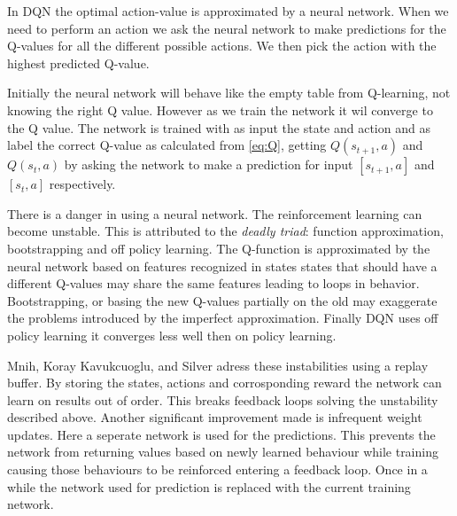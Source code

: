 In DQN the optimal action-value is approximated by a neural network. When we need to perform an action we ask the neural network to make predictions for the Q-values for all the different possible actions. We then pick the action with the highest predicted Q-value. 
 
Initially the neural network will behave like the empty table from Q-learning, not knowing the right Q value. However as we train the network it wil converge to the Q value. The network is trained with as input the state and action and as label the correct Q-value as calculated from \autoref{eq:Q}, getting $Q\left(s_{t+1}, a\right)$ and $Q\left(s_{t}, a\right)$ by asking the network to make a prediction for input $[s_{t+1}, a]$ and $[s_{t}, a]$ respectively. 

There is a danger in using a neural network. The reinforcement learning can become unstable\cite{triad}. This is attributed to the \textit{deadly triad}: function approximation, bootstrapping and off policy learning. The Q-function is approximated by the neural network based on features recognized in states states that should have a different Q-values may share the same features leading to loops in behavior. Bootstrapping, or basing the new Q-values partially on the old may exaggerate the problems introduced by the imperfect approximation. Finally DQN uses off policy learning it converges less well then on policy learning.

Mnih, Koray Kavukcuoglu, and Silver\cite{DQN} adress these instabilities using a replay buffer. By storing the states, actions and corrosponding reward the network can learn on results out of order. This breaks feedback loops solving the unstability described above. Another significant improvement made is infrequent weight updates. Here a seperate network is used for the predictions. This prevents the network from returning values based on newly learned behaviour while training causing those behaviours to be reinforced entering a feedback loop. Once in a while the network used for prediction is replaced with the current training network.